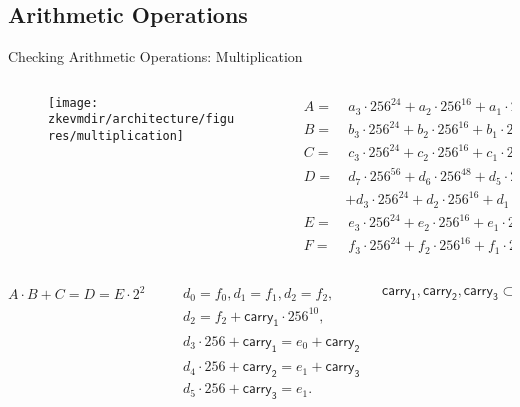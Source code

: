 \subsection{Arithmetic Operations}

\begin{frame}{Checking Arithmetic Operations: Multiplication}
\scriptsize
\begin{columns}
\begin{column}{0.5\textwidth}
\begin{figure}
	\texttt{[image: \\zkevmdir/architecture/figures/multiplication]}
\end{figure}
\end{column}
\begin{column}{0.5\textwidth}
\begin{align*}
A = &~a_3 \cdot 256^{24} + a_2 \cdot 256^{16} + a_1 \cdot 256^{8} + a_0, \\
B = &~b_3 \cdot 256^{24} + b_2 \cdot 256^{16} + b_1 \cdot 256^{8} + b_0, \\
C = &~c_3 \cdot 256^{24} + c_2 \cdot 256^{16} + c_1 \cdot 256^{8} + c_0, \\
D = &~d_7 \cdot 256^{56} + d_6 \cdot 256^{48} + d_5 \cdot 256^{40} + d_4 \cdot 256^{32} \\
&+ d_3 \cdot 256^{24} + d_2 \cdot 256^{16} + d_1 \cdot 256^{8} + d_0, \\
E = &~e_3 \cdot 256^{24} + e_2 \cdot 256^{16} + e_1 \cdot 256^{8} + e_0, \\
F = &~f_3 \cdot 256^{24} + f_2 \cdot 256^{16} + f_1 \cdot 256^{8} + f_0,
\end{align*}
\end{column}
\end{columns}
\begin{columns}
\begin{column}{0.33\textwidth}
\[
A \cdot B + C = D = E \cdot 2^{256} + F
\]
\end{column}
\begin{column}{0.33\textwidth}
\begin{align*}
&d_0 = f_0, d_1 = f_1, d_2 = f_2,\\
&d_2 = f_2 + \mathsf{carry_1} \cdot 256^{10}, \\
&d_3 \cdot 256 + \mathsf{carry_1} = e_0 + \mathsf{carry_2} \cdot 256^{11}, \\
&d_4 \cdot 256 + \mathsf{carry_2} = e_1 + \mathsf{carry_3} \cdot 256^{11}, \\
&d_5 \cdot 256 + \mathsf{carry_3} = e_1.
\end{align*}
\end{column}
\begin{column}{0.33\textwidth}
\[
\mathsf{carry_1}, \mathsf{carry_2}, \mathsf{carry_3} \subset \mathsf{byte}.
\]
\end{column}
\end{columns}
\end{frame}









